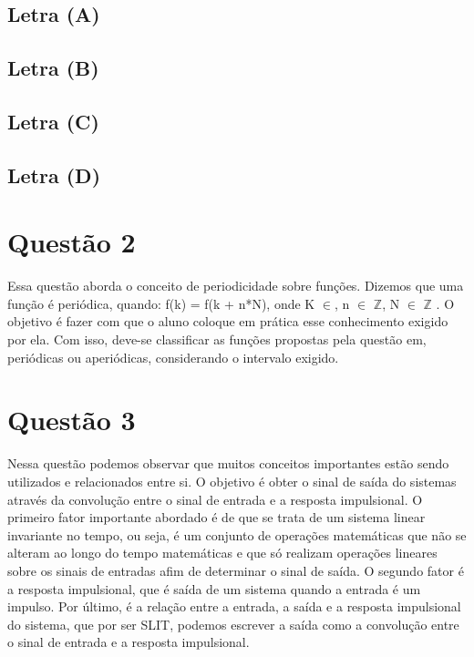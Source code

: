 \documentclass[12pt,a4paper]{report}
\begin{document}
	\subsection{Letra (A)}
	
	\subsection{Letra (B)}
	
	\subsection{Letra (C)}
	
	\subsection{Letra (D)}


\section{Questão 2}
Essa questão aborda o conceito de periodicidade sobre funções. Dizemos que uma função é periódica, quando: f(k) = f(k + n*N), onde K $\in$, n $\in$ $\mathbb{Z}$, N $\in$ $\mathbb{Z}$ .
O objetivo é fazer com que o aluno coloque em prática esse conhecimento exigido por ela. Com isso, deve-se classificar as funções propostas pela questão em, periódicas ou aperiódicas, considerando o intervalo exigido.

\section{Questão 3}
Nessa questão podemos observar que muitos conceitos importantes estão sendo utilizados e relacionados entre si. O objetivo é obter o sinal de saída do sistemas através da convolução entre o sinal de entrada e a resposta impulsional. O primeiro fator importante abordado é de que se trata de um sistema linear invariante no tempo, ou seja, é um conjunto de operações matemáticas que não se alteram ao longo do tempo matemáticas e que só realizam operações lineares sobre os sinais de entradas afim de determinar o sinal de saída. O segundo fator é a resposta impulsional, que é saída de um sistema quando a entrada é um impulso. Por último, é a relação entre a entrada, a saída e a resposta impulsional do sistema, que por ser SLIT, podemos escrever a saída como a convolução entre o sinal de entrada e a resposta impulsional.
\end{document}
